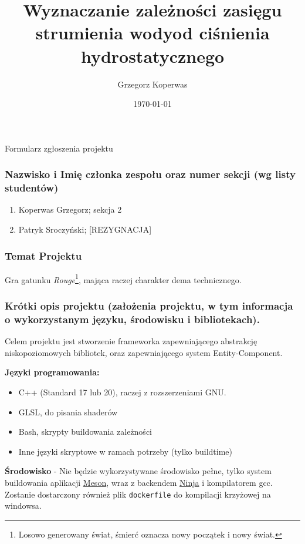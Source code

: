 \documentclass[a4paper,11pt]{article}
\title{Wyznaczanie zależności zasięgu strumienia wodyod ciśnienia hydrostatycznego}
\author{Grzegorz Koperwas}
\date{\today}
\begin{document}
\begin{center}
    \begin{Large}
        Formularz zgłoszenia projektu
    \end{Large}
\end{center}

\subsubsection*{Nazwisko i Imię członka zespołu oraz numer sekcji (wg listy studentów)}

\begin{enumerate}
    \item Koperwas Grzegorz; sekcja 2 
    \item Patryk Sroczyński; [REZYGNACJA]
\end{enumerate}

\subsubsection*{Temat Projektu}

Gra gatunku \emph{Rouge}\footnote{Losowo generowany świat, śmierć oznacza nowy początek i nowy świat.}, mająca raczej charakter dema technicznego.

\subsubsection*{Krótki opis projektu (założenia projektu, w tym informacja o wykorzystanym języku, środowisku i bibliotekach).}

Celem projektu jest stworzenie frameworka zapewniającego abstrakcję niskopoziomowych bibliotek, oraz zapewniającego system Entity-Component.

\vspace{5mm}

\textbf{Języki programowania:}
\begin{itemize}
    \item C++ (Standard 17 lub 20), raczej z rozszerzeniami GNU.
    \item GLSL, do pisania shaderów
    \item Bash, skrypty buildowania zależności
    \item Inne języki skryptowe w ramach potrzeby (tylko buildtime)
\end{itemize}

\textbf{Środowisko} - Nie będzie wykorzystywane środowisko pełne, tylko system buildowania aplikacji \href{https://mesonbuild.com/}{Meson}, wraz z backendem \href{https://ninja-build.org/}{Ninja} i kompilatorem gcc. Zostanie dostarczony również plik \texttt{dockerfile} do kompilacji krzyżowej na windowsa.
\end{document}

